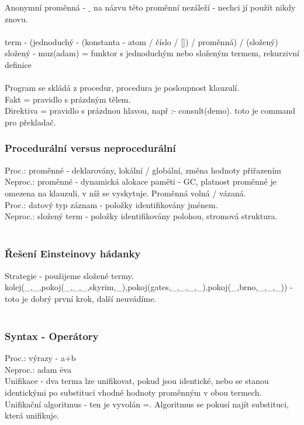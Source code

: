 \documentclass{article}
\begin{document}
Anonymní proměnná - $\_$ na názvu této proměnní nezáleží - nechci jí použít nikdy znovu.\\\\

term - (jednoduchý - (konstanta - atom / číslo / []) / proměnná) / (složený)\\
složený - muz(adam) = funktor s jednoduchým nebo složeným termem, rekurzivní definice\\\\

Program se skládá z procedur, procedura je posloupnost klauzulí.\\
Fakt = pravidlo s prázdným tělem. \\
Direktiva = pravidlo s prázdnou hlavou, např :- consult(demo). toto je command pro překladač.\\
\subsubsection*{Procedurální versus neprocedurální}
Proc.: proměnné - deklarovány, lokální / globální, změna hodnoty přiřazením\\
Neproc.: proměnné - dynamická alokace paměti - GC, platnost proměnné je omezena na klauzuli, v níž se vyskytuje.
Proměnná volná / vázaná.\\
Proc.: datový typ záznam - položky identifikovány jménem.\\
Neproc.: složený term - položky identifikovány polohou, stromová struktura.\\\\

\subsubsection*{Řešení Einsteinovy hádanky}
Strategie - použijeme složené termy.\\
kolej(\_,\_,pokoj(\_,\_,\_,skyrim,\_),pokoj(gates,\_,\_,\_,\_),pokoj(\_,brno,\_,\_,\_)) - toto je dobrý první krok, další neuvádíme.\\\\

\subsubsection*{Syntax - Operátory}
Proc.: výrazy - a+b\\
Neproc.: adam \= eva\\

Unifikace - dva terma lze unifikovat, pokud jsou identické, nebo se stanou identickými po substituci vhodné hodnoty proměnným v obou 
termech.\\
Unifikační algoritmus - ten je vyvolán =. Algoritmus se pokusí najít substituci, která unifikuje.
\end{document}
